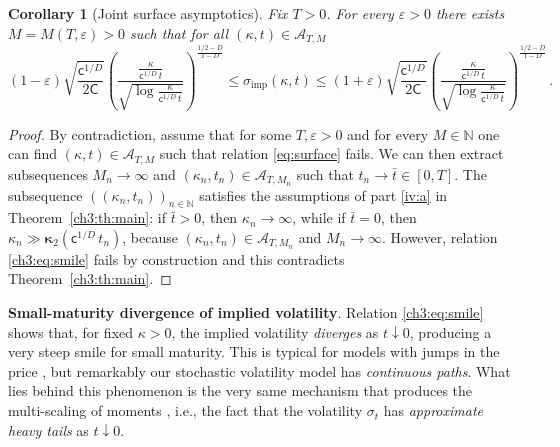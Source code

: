 \documentclass[a4paper,reqno,11pt]{amsart}
\numberwithin{equation}{section}
\newtheorem{corollary}[theorem]{Corollary}
\newcommand{\cA}{{\ensuremath{\mathcal A}} }
\newcommand{\N}{\mathbb{N}}
\renewcommand{\epsilon}{\varepsilon}
\newcommand\sfc{\mathsf{c}}
\newcommand\sfC{\mathsf{C}}
\newcommand\imp{\mathrm{imp}}
\newcommand\bkappa{\boldsymbol{\kappa}}
\begin{document}
\begin{corollary}[Joint surface asymptotics]\label{ch3:th:surface}
Fix $T > 0$. For every $\epsilon > 0$ there exists $M = M(T,\epsilon) > 0$ such that
for all $(\kappa,t) \in \cA_{T,M}$
\begin{equation}\label{eq:surface}
	(1-\epsilon)
	\sqrt{\frac{\sfc^{1/D}}{2 \sfC}} 
	\left(\frac{\frac{\kappa}{\sfc^{1/D} \, t}}
	{\sqrt{\log \frac{\kappa}{\sfc^{1/D} \, t}}}\right)^{\frac{1/2-D}{1-D}} 
	\le \sigma_\imp(\kappa,t) \le
	(1+\epsilon)
	\sqrt{\frac{\sfc^{1/D}}{2 \sfC}} 
	\left(\frac{\frac{\kappa}{\sfc^{1/D} \, t}}
	{\sqrt{\log \frac{\kappa}{\sfc^{1/D} \, t}}}\right)^{\frac{1/2-D}{1-D}} \,.
\end{equation}
\end{corollary}

\begin{proof}
By contradiction, assume that for some $T, \epsilon > 0$
and for every $M \in \N$ one can find $(\kappa, t) \in \cA_{T,M}$
such that relation \eqref{eq:surface} fails. We can then extract subsequences
$M_n \to \infty$ and $(\kappa_{n}, t_{n}) \in \cA_{T, M_n}$ such that $t_{n} \to \bar t \in [0,T]$.
The subsequence $((\kappa_{n}, t_{n}))_{n\in\N}$ satisfies the assumptions of
part \eqref{iv:a} in Theorem~\ref{ch3:th:main}: if $\bar t > 0$, then $\kappa_{n} \to \infty$, while
if $\bar t = 0$, then $\kappa_{n} \gg \bkappa_2(\sfc^{1/D} \, t_{n})$, because 
$(\kappa_{n}, t_{n}) \in \cA_{T, M_n}$
and $M_n \to \infty$.
However, relation \eqref{ch3:eq:smile} fails by construction and this
contradicts Theorem~\ref{ch3:th:main}.
\end{proof}

\smallskip
\noindent
\textbf{Small-maturity divergence of implied volatility}.
Relation \eqref{ch3:eq:smile} shows
that, for fixed $\kappa > 0$, the implied volatility \emph{diverges}
as $t \downarrow 0$, producing a very steep smile for
small maturity. This is typical
for models with jumps in the price \cite{cf:AL12}, but remarkably our
stochastic volatility model has \emph{continuous paths}.
What lies behind this phenomenon is the very same mechanism
that produces the multi-scaling of moments \cite{cf:ACDP}, i.e.,
the fact that the volatility $\sigma_t$ has \emph{approximate heavy tails}
as $t \downarrow 0$.
\end{document}
